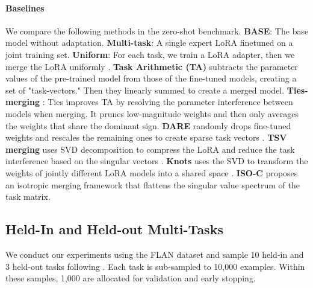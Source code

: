 \documentclass[10pt]{article} %
\begin{document}
    \paragraph{Baselines}
    We compare the following methods in the zero-shot benchmark. \textbf{BASE}: The
    base model without adaptation. \textbf{Multi-task}: A single expert LoRA
    finetuned on a joint training set. \textbf{Uniform}:
    For each task, we train a LoRA adapter, then we merge the LoRA uniformly
    \citep{huang2023lorahub,chronopoulou2023adaptersoup}. \textbf{Task
    Arithmetic (TA)} \citep{ilharco2022editing} subtracts the parameter values
    of the pre-trained model from those of the fine-tuned models, creating a set
    of "task-vectors." Then they linearly summed to create a merged model.
    \textbf{Ties-merging} \citep{yadav2023ties}: Ties improves TA by resolving the
    parameter interference between models when merging. It prunes low-magnitude
    weights and then only averages the weights that share the dominant sign. \textbf{DARE}
    randomly drops fine-tuned weights and rescales the remaining ones to create
    sparse task vectors \cite{yu2024language}. \textbf{TSV merging} uses SVD decomposition to compress the LoRA and reduce the task interference based on the singular vectors \citep{marczak2025no}.  \textbf{Knots} uses the SVD to transform the weights of jointly
    different LoRA models into a shared space \citet{stoica2025model}. \textbf{ISO-C}
    \cite{marczak2025no} proposes an isotropic merging framework that flattens
    the singular value spectrum of the
    task matrix. 
    
    \subsection{Held-In and Held-out Multi-Tasks}
    \label{sec:held_in_out}

    We conduct our experiments using the FLAN dataset \citep{longpre2023flan} and
    sample 10 held-in and 3 held-out tasks following \citep{ostapenko2024towards,arnob2025exploring}.
    Each task is sub-sampled to 10,000 examples. Within these samples, 1,000 are
    allocated for validation and early stopping.
\end{document}
